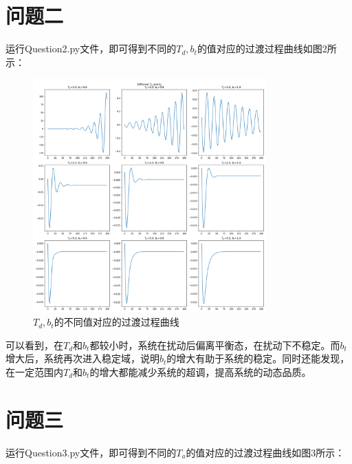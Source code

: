 \documentclass[UTF8]{ctexart}
\begin{document}
\section{问题二}

运行Question2.py文件，即可得到不同的$T_d,b_t$的值对应的过渡过程曲线如图2所示：

\begin{figure}[htbp]
    \centering
    \includegraphics[width=0.8\textwidth]{pic/dif_td_bt.png}
    \caption{$T_d,b_t$的不同值对应的过渡过程曲线}
\end{figure}

可以看到，在$T_d$和$b_t$都较小时，系统在扰动后偏离平衡态，在扰动下不稳定。而$b_t$增大后，系统再次进入稳定域，说明$b_t$的增大有助于系统的稳定。同时还能发现，在一定范围内$T_d$和$b_t$的增大都能减少系统的超调，提高系统的动态品质。

\section{问题三}

运行Question3.py文件，即可得到不同的$T_a$的值对应的过渡过程曲线如图3所示：
\end{document}
